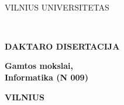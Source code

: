 \newpage
\thispagestyle{empty}                   %
{\selectfont
\linespread{1.15}\selectfont
\renewcommand\bfdefault{m}
\begin{flushright}
    \thesisDOI \\
    \thesisORCID
\end{flushright}

\begin{center}
	\vspace*{5mm}	
	\begin{flushleft}
         \fontsize{12}{12}\selectfont
	       VILNIUS UNIVERSITETAS \\
	\end{flushleft}
 
	\vspace{50mm}
	\begin{flushleft}
	   {\fontsize{15}{15}\selectfont  \thesisAuthorName  \\ \MakeUppercase{\thesisAuthorSurname} \par}
    \end{flushleft}

	\vspace{10mm}
	\begin{flushleft}
    	{ \fontsize{21}{21}\selectfont
    	   \thesisTitleLT \par
    	}
    \end{flushleft}

    \vspace{50mm minus 45mm}
    \begin{flushleft}
        \renewcommand\bfdefault{b}
        \fontsize{12}{12}\selectfont
        {\bf DAKTARO DISERTACIJA}\\ 
    \end{flushleft}
    
    \vspace{5mm}
    \begin{flushleft}
        \renewcommand\bfdefault{m}
        \fontsize{12}{12}\selectfont
        \bf
            Gamtos mokslai, \\ %
            Informatika (N 009)  %
    \end{flushleft}
    
    \vspace{6mm}
    \begin{flushleft} 
         \fontsize{9}{9}\selectfont
        \bf VILNIUS \thesisYear
    \end{flushleft} 
\end{center}
}

